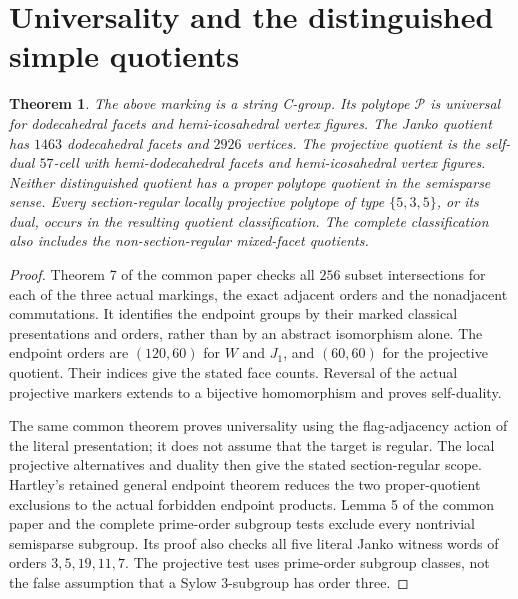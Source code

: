 \documentclass[11pt,a4paper]{article}
\newtheorem{theorem}{Theorem}\newtheorem{lemma}[theorem]{Lemma}
\begin{document}
\section{Universality and the distinguished simple quotients}
\begin{theorem}\label{geometry}
The above marking is a string C-group. Its polytope $\mathcal P$ is universal for dodecahedral facets and hemi-icosahedral vertex figures. The Janko quotient has $1463$ dodecahedral facets and $2926$ vertices. The projective quotient is the self-dual $57$-cell with hemi-dodecahedral facets and hemi-icosahedral vertex figures. Neither distinguished quotient has a proper polytope quotient in the semisparse sense. Every section-regular locally projective polytope of type $\{5,3,5\}$, or its dual, occurs in the resulting quotient classification. The complete classification also includes the non-section-regular mixed-facet quotients.
\end{theorem}
\begin{proof}
Theorem 7 of the common paper checks all $256$ subset intersections for each of the three actual markings, the exact adjacent orders and the nonadjacent commutations. It identifies the endpoint groups by their marked classical presentations and orders, rather than by an abstract isomorphism alone. The endpoint orders are $(120,60)$ for $W$ and $J_1$, and $(60,60)$ for the projective quotient. Their indices give the stated face counts. Reversal of the actual projective markers extends to a bijective homomorphism and proves self-duality.

The same common theorem proves universality using the flag-adjacency action of the literal presentation; it does not assume that the target is regular. The local projective alternatives and duality then give the stated section-regular scope. Hartley's retained general endpoint theorem reduces the two proper-quotient exclusions to the actual forbidden endpoint products. Lemma 5 of the common paper and the complete prime-order subgroup tests exclude every nontrivial semisparse subgroup. Its proof also checks all five literal Janko witness words of orders $3,5,19,11,7$. The projective test uses prime-order subgroup classes, not the false assumption that a Sylow $3$-subgroup has order three.
\end{proof}
\end{document}
